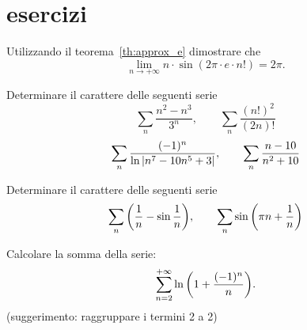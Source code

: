 \section{esercizi}

\begin{exercise}
  Utilizzando il teorema~\ref{th:approx_e} dimostrare che
  \[
  \lim_{n\to +\infty} n \cdot \sin(2\pi \cdot e\cdot n!) = 2\pi.
  \]
\end{exercise}

\begin{exercise}
Determinare il carattere delle seguenti serie
\[
    \sum_n \frac{n^2-n^3}{3^n}, \qquad
    \sum_n \frac{(n!)^2}{(2n)!}
\]
\[
\sum_n \frac{(-1)^n}{\ln{\left|n^7 - 10n^5 + 3\right|}},  \qquad
\sum_n \frac{n-10}{n^2+10}
\]
\end{exercise}
  
\begin{exercise}
  Determinare il carattere delle seguenti serie
  \[
    \sum_n {\left( \frac 1 n - \sin \frac 1 n \right)},\qquad
    \sum_n \sin{\left( \pi n + \frac 1 n \right)}
  \]
\end{exercise}
  
\begin{exercise}
Calcolare la somma della serie:
\[
  \sum_{n=2}^{+\infty} \ln{\left( 1+\frac{(-1)^n}{n} \right)}.
\]
(suggerimento: raggruppare i termini 2 a 2)
\end{exercise}
  
